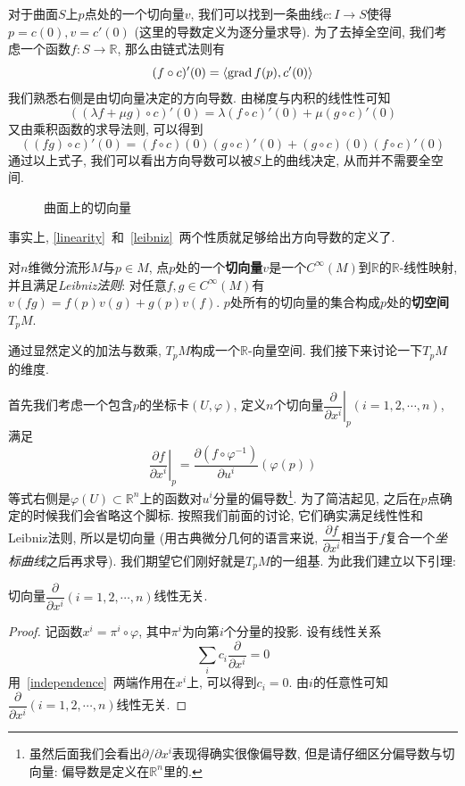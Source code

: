 对于曲面$S$上$p$点处的一个切向量$v$, 我们可以找到一条曲线$c:I\to S$使得$p=c(0),v=c'(0)$ (这里的导数定义为逐分量求导).
为了去掉全空间, 我们考虑一个函数$f:S\to\mathbb{R}$, 那么由链式法则有
\[(f\circ c)'(0)=\langle\operatorname{grad}{f}(p),c'(0)\rangle\]
我们熟悉右侧是由切向量决定的方向导数.
由梯度与内积的线性性可知
\begin{equation}
    ((\lambda f+\mu g)\circ c)'(0)=\lambda(f\circ c)'(0)+\mu(g\circ c)'(0)\label{linearity}
\end{equation}
又由乘积函数的求导法则, 可以得到
\begin{equation}
    ((fg)\circ c)'(0)=(f\circ c)(0)(g\circ c)'(0)+(g\circ c)(0)(f\circ c)'(0)\label{leibniz}
\end{equation}
通过以上式子, 我们可以看出方向导数可以被$S$上的曲线决定, 从而并不需要全空间.

\begin{figure}[ht]
    \centering
    
    \caption{曲面上的切向量}
\end{figure}

事实上, \eqref{linearity}~和~\eqref{leibniz}~两个性质就足够给出方向导数的定义了.

\begin{defn}
    对$n$维微分流形$M$与$p\in M$, 点$p$处的一个\textbf{切向量}$v$是一个$C^\infty(M)$到$\mathbb{R}$的$\mathbb{R}$-线性映射, 并且满足\textit{Leibniz法则}: 对任意$f,g\in C^\infty(M)$有$v(fg)=f(p)v(g)+g(p)v(f)$.
    $p$处所有的切向量的集合构成$p$处的\textbf{切空间}$T_pM$.
\end{defn}

通过显然定义的加法与数乘, $T_pM$构成一个$\mathbb{R}$-向量空间.
我们接下来讨论一下$T_pM$的维度.

首先我们考虑一个包含$p$的坐标卡$(U,\varphi)$, 定义$n$个切向量$\left.\dfrac{\partial}{\partial x^i}\right|_p(i=1,2,\cdots,n)$, 满足
\[\left.\frac{\partial f}{\partial x^i}\right|_p=\frac{\partial (f\circ\varphi^{-1})}{\partial u^i}(\varphi(p))\]
等式右侧是$\varphi(U)\subset\mathbb{R}^n$上的函数对$u^i$分量的偏导数\footnote{虽然后面我们会看出$\partial/\partial x^i$表现得确实很像偏导数, 但是请仔细区分偏导数与切向量: 偏导数是定义在$\mathbb{R}^n$里的.}.
为了简洁起见, 之后在$p$点确定的时候我们会省略这个脚标.
按照我们前面的讨论, 它们确实满足线性性和Leibniz法则, 所以是切向量 (用古典微分几何的语言来说, $\dfrac{\partial f}{\partial x^i}$相当于$f$复合一个\textit{坐标曲线}之后再求导).
我们期望它们刚好就是$T_pM$的一组基.
为此我们建立以下引理:

\begin{lem}\label{lem_indep}
    切向量$\dfrac{\partial}{\partial x^i}(i=1,2,\cdots,n)$线性无关.
\end{lem}
\begin{proof}
    记函数$x^i=\pi^i\circ\varphi$, 其中$\pi^i$为向第$i$个分量的投影.
    设有线性关系
    \begin{equation}
        \sum_ic_i\frac{\partial}{\partial x^i}=0\label{independence}
    \end{equation}
    用~\eqref{independence}~两端作用在$x^i$上, 可以得到$c_i=0$.
    由$i$的任意性可知$\dfrac{\partial}{\partial x^i}(i=1,2,\cdots,n)$线性无关.
\end{proof}

